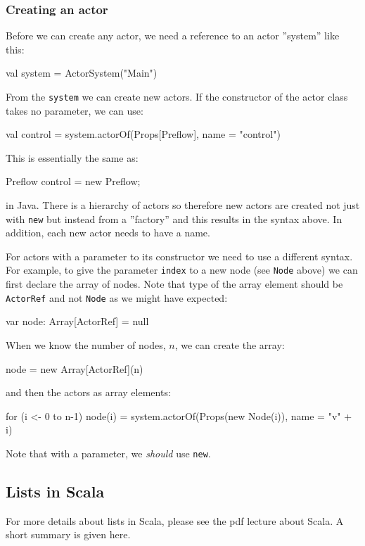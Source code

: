 \documentclass{forsete}
\begin{document}
\subsubsection*{Creating an actor}
Before we can create any actor, we need a reference to an actor ''system'' like this:
\begin{ccode}
	val system = ActorSystem("Main")
\end{ccode}
From the \verb.system. we can create new actors. If the constructor of the actor class
takes no parameter, we can use:
\begin{ccode}
val control = system.actorOf(Props[Preflow], name = "control")
\end{ccode}
This is essentially the same as:
\begin{ccode}
Preflow control = new Preflow;
\end{ccode}
in Java. There is a hierarchy of actors so therefore new actors are created not just with \verb.new.
but instead from a ''factory'' and this results in the syntax above. In addition, each new actor needs
to have a name.

For actors with a parameter to its constructor we need to use a different syntax.
For example, to give the parameter \verb.index. to a new node (see \verb.Node. above) we
can first declare the array of nodes. Note that type of the array element should be \verb.ActorRef.
and not \verb.Node. as we might have expected:
\begin{ccode}
var	node: Array[ActorRef] = null
\end{ccode}

\noindent When we know the number of nodes, $n$, we can create the array:
\begin{ccode}
node = new Array[ActorRef](n)
\end{ccode}

\noindent and then the actors as array elements:

\begin{ccode}
for (i <- 0 to n-1)
	node(i) = system.actorOf(Props(new Node(i)), name = "v" + i)
\end{ccode}
Note that with a parameter, we {\em should} use \verb.new..

\subsection*{Lists in Scala}
For more details about lists in Scala, please see the pdf lecture about Scala.
A short summary is given here.
\end{document}
